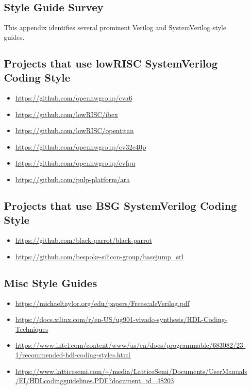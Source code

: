 \begin{appendices}
\chapter{Style Guide Survey}
\label{appx:style_guides}

This appendix identifies several prominent Verilog and SystemVerilog style guides.

\section{Projects that use lowRISC SystemVerilog Coding Style}

\begin{itemize}
    \item \url{https://github.com/openhwgroup/cva6}
    \item \url{https://github.com/lowRISC/ibex}
    \item \url{https://github.com/lowRISC/opentitan}
    \item \url{https://github.com/openhwgroup/cv32e40p}
    \item \url{https://github.com/openhwgroup/cvfpu}
    \item \url{https://github.com/pulp-platform/ara}
\end{itemize}

\section{Projects that use BSG SystemVerilog Coding Style}

\begin{itemize}
    \item \url{https://github.com/black-parrot/black-parrot}
    \item \url{https://github.com/bespoke-silicon-group/basejump_stl}
\end{itemize}

\section{Misc Style Guides}

\begin{itemize}
    \item \url{https://michaeltaylor.org/edu/papers/FreescaleVerilog.pdf}
    \item \url{https://docs.xilinx.com/r/en-US/ug901-vivado-synthesis/HDL-Coding-Techniques}
    \item \url{https://www.intel.com/content/www/us/en/docs/programmable/683082/23-1/recommended-hdl-coding-styles.html}
    \item \url{https://www.latticesemi.com/~/media/LatticeSemi/Documents/UserManuals/EI/HDLcodingguidelines.PDF?document_id=48203}
\end{itemize}


\end{appendices}
